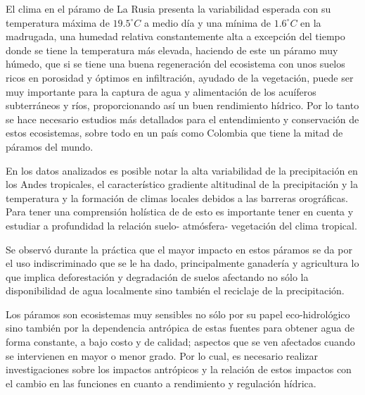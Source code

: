 \documentclass[conference,final,]{IEEEtran}
\begin{document}
El clima en el páramo de La Rusia presenta la variabilidad esperada con
su temperatura máxima de \(19.5^{\circ}C\) a medio día y una mínima de
\(1.6^{\circ}C\) en la madrugada, una humedad relativa constantemente
alta a excepción del tiempo donde se tiene la temperatura más elevada,
haciendo de este un páramo muy húmedo, que si se tiene una buena
regeneración del ecosistema con unos suelos ricos en porosidad y óptimos
en infiltración, ayudado de la vegetación, puede ser muy importante para
la captura de agua y alimentación de los acuíferos subterráneos y ríos,
proporcionando así un buen rendimiento hídrico. Por lo tanto se hace
necesario estudios más detallados para el entendimiento y conservación
de estos ecosistemas, sobre todo en un país como Colombia que tiene la
mitad de páramos del mundo.

En los datos analizados es posible notar la alta variabilidad de la
precipitación en los Andes tropicales, el característico gradiente
altitudinal de la precipitación y la temperatura y la formación de
climas locales debidos a las barreras orográficas. Para tener una
comprensión holística de de esto es importante tener en cuenta y
estudiar a profundidad la relación suelo- atmósfera- vegetación del
clima tropical.

Se observó durante la práctica que el mayor impacto en estos páramos se
da por el uso indiscriminado que se le ha dado, principalmente ganadería
y agricultura lo que implica deforestación y degradación de suelos
afectando no sólo la disponibilidad de agua localmente sino también el
reciclaje de la precipitación.

Los páramos son ecosistemas muy sensibles no sólo por su papel
eco-hidrológico sino también por la dependencia antrópica de estas
fuentes para obtener agua de forma constante, a bajo costo y de calidad;
aspectos que se ven afectados cuando se intervienen en mayor o menor
grado. Por lo cual, es necesario realizar investigaciones sobre los
impactos antrópicos y la relación de estos impactos con el cambio en las
funciones en cuanto a rendimiento y regulación hídrica.
\end{document}

